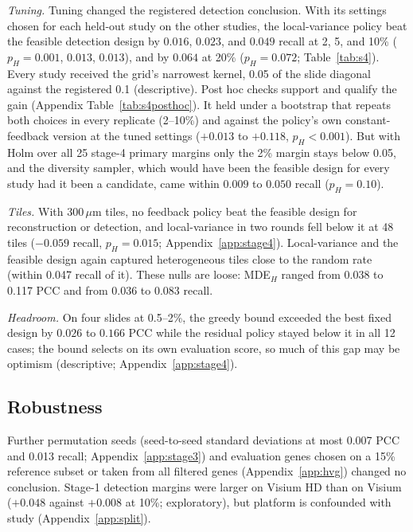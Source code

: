 \documentclass[10pt]{article}
\newcommand{\fittable}[1]{\resizebox{\ifdim\width>\linewidth\linewidth\else\width\fi}{!}{#1}}
\begin{document}
\emph{Tuning.} Tuning changed the registered detection conclusion. With its settings chosen for each held-out
study on the other studies, the local-variance policy beat the feasible detection design by $0.016$, $0.023$, and
$0.049$ recall at 2, 5, and 10\% ($p_H=0.001$, $0.013$, $0.013$), and by $0.064$ at 20\% ($p_H=0.072$;
Table~\ref{tab:s4}). Every study received the grid's narrowest kernel, 0.05 of the slide diagonal against the
registered 0.1 (descriptive). Post hoc checks support and qualify the gain (Appendix Table~\ref{tab:s4posthoc}). It
held under a bootstrap that repeats both choices in every replicate (2--10\%) and against the policy's own
constant-feedback version at the tuned settings ($+0.013$ to $+0.118$, $p_H<0.001$). But with Holm over all
25 stage-4 primary margins only the 2\% margin stays below 0.05, and the diversity sampler, which would have been the
feasible design for every study had it been a candidate, came within $0.009$ to $0.050$ recall ($p_H=0.10$).

\emph{Tiles.} With 300\,$\mu$m tiles, no feedback policy beat the feasible design for reconstruction or detection,
and local-variance in two rounds fell below it at 48 tiles ($-0.059$ recall, $p_H=0.015$;
Appendix~\ref{app:stage4}). Local-variance and the feasible design again captured heterogeneous tiles close to
the random rate (within 0.047 recall of it). These nulls are loose: MDE$_H$ ranged from 0.038 to 0.117 PCC and from
0.036 to 0.083 recall.

\emph{Headroom.} On four slides at 0.5--2\%, the greedy bound exceeded the best fixed design by $0.026$ to $0.166$
PCC while the residual policy stayed below it in all 12 cases; the bound selects on its own evaluation score, so
much of this gap may be optimism (descriptive; Appendix~\ref{app:stage4}).

\begin{table}[t]
\centering
\caption{Stage-4 primary margins, 22 slides. Reconstruction margins are scored on regions withheld from every
policy; the tuned policy's settings are chosen for each held-out study on the other studies. $\Delta$ with
unadjusted 95\% CI resampling studies; $p_H$ Holm-adjusted within the registered family (12 common-set margins; 4
tuning margins).}
\label{tab:s4}
\fittable{}
\end{table}

\subsection{Robustness}
Further permutation seeds (seed-to-seed standard deviations at most 0.007 PCC and 0.013 recall;
Appendix~\ref{app:stage3}) and evaluation genes chosen on a 15\% reference subset or taken from all filtered genes
(Appendix~\ref{app:hvg}) changed no conclusion. Stage-1 detection margins were larger on Visium HD than on Visium
($+0.048$ against $+0.008$ at 10\%; exploratory), but platform is confounded with study (Appendix~\ref{app:split}).
\end{document}
